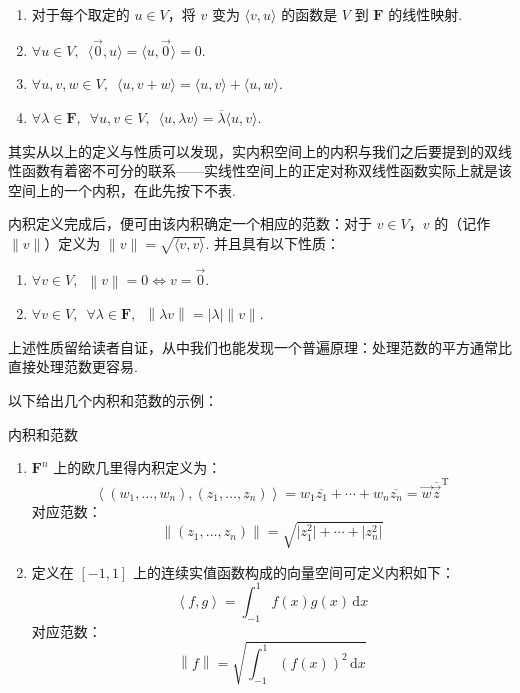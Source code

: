 \begin{enumerate}
    \item 对于每个取定的 $u \in V$，将 $ v $ 变为 $\langle v, u \rangle$ 的函数是 $ V $ 到 $\mathbf{F}$ 的线性映射.

    \item $\forall u \in V, \enspace \langle \vec{0}, u \rangle = \langle u, \vec{0} \rangle = 0$.

    \item $\forall u, v, w \in V, \enspace \langle u, v + w \rangle = \langle u, v \rangle + \langle u, w \rangle$.

    \item $\forall \lambda \in \mathbf{F}, \enspace \forall u, v \in V, \enspace \langle u, \lambda v \rangle = \overline{\lambda} \langle u, v \rangle$.
\end{enumerate}

其实从以上的定义与性质可以发现，实内积空间上的内积与我们之后要提到的双线性函数有着密不可分的联系——实线性空间上的正定对称双线性函数实际上就是该空间上的一个内积，在此先按下不表.

内积定义完成后，便可由该内积确定一个相应的范数：对于 $v \in V$，$v$ 的（记作 $ \lVert v \rVert $）定义为 $ \lVert v \rVert = \sqrt{\langle v, v \rangle}$. 并且具有以下性质：

\begin{enumerate}
    \item $\forall v \in V, \enspace \left\lVert v \right\rVert = 0 \iff v = \vec{0}$.

    \item $\forall v \in V, \enspace \forall \lambda \in \mathbf{F}, \enspace \left\lVert \lambda v \right\rVert  = \left\lvert \lambda \right\rvert \lVert v \rVert$.
\end{enumerate}

上述性质留给读者自证，从中我们也能发现一个普遍原理：处理范数的平方通常比直接处理范数更容易.

以下给出几个内积和范数的示例：

\begin{example}{}{内积和范数}
    \begin{enumerate}
        \item $\mathbf{F}^{n}$ 上的欧几里得内积定义为：
              \[\left\langle (w_1, \ldots, w_n), (z_1, \ldots, z_n)\right\rangle = w_1\overline{z_1} + \cdots + w_n\overline{z_n} = \vec{w}\overline{\vec{z}}^{\mathrm{T}}\]
              对应范数：
              \[\left\lVert (z_1, \ldots, z_n) \right\rVert  = \sqrt{\lvert z^2_1 \rvert + \cdots + \lvert z^2_n \rvert}\]

        \item \label{item:23:内积和范数:2}
              定义在 $ \left[-1, 1\right] $ 上的连续实值函数构成的向量空间可定义内积如下：
              \[\left\langle f, g\right\rangle = \int_{-1}^1f(x)g(x)\,\mathrm{d}x\]
              对应范数：
              \[\left\lVert f \right\rVert = \sqrt{\int_{-1}^1(f(x))^2\,\mathrm{d}x}\]
    \end{enumerate}
\end{example}

